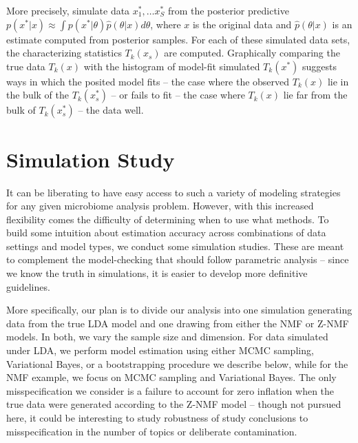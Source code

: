 \documentclass[oupdraft]{bio}
\begin{document}
More precisely, simulate data $x_{1}^{\ast}, \dots x_{S}^{\ast}$ from the
posterior predictive $p\left(x^{\ast}\vert x\right) \approx \int p\left(x^{\ast}
\vert \theta\right) \hat{p}\left(\theta \vert x \right)d\theta$, where $x$ is
the original data and $\hat{p}\left(\theta \vert x\right)$ is an estimate
computed from posterior samples. For each of these simulated data sets, the
characterizing statistics $T_{k}\left(x_{s}\right)$ are computed. Graphically
comparing the true data $T_{k}\left(x\right)$ with the histogram of model-fit
simulated $T_{k}\left(x^{\ast}\right)$ suggests ways in which the posited model
fits -- the case where the observed $T_{k}\left(x\right)$ lie in the bulk of the
$T_{k}\left(x^{\ast}_{s}\right)$ -- or fails to fit -- the case where
$T_{k}\left(x\right)$ lie far from the bulk of $T_{k}\left(x^{\ast}_{s}\right)$
-- the data well.

\section{Simulation Study}

It can be liberating to have easy access to such a variety of modeling
strategies for any given microbiome analysis problem. However, with this
increased flexibility comes the difficulty of determining when to use what
methods. To build some intuition about estimation accuracy across combinations
of data settings and model types, we conduct some simulation studies. These are
meant to complement the model-checking that should follow parametric analysis --
since we know the truth in simulations, it is easier to develop more definitive
guidelines.

More specifically, our plan is to divide our analysis into one simulation
generating data from the true LDA model and one drawing from either the NMF or
Z-NMF models. In both, we vary the sample size and dimension. For data simulated
under LDA, we perform model estimation using either MCMC sampling, Variational
Bayes, or a bootstrapping procedure we describe below, while for the NMF
example, we focus on MCMC sampling and Variational Bayes. The only
misspecification we consider is a failure to account for zero inflation when the
true data were generated according to the Z-NMF model -- though not pursued
here, it could be interesting to study robustness of study conclusions to
misspecification in the number of topics or deliberate contamination.
\end{document}
